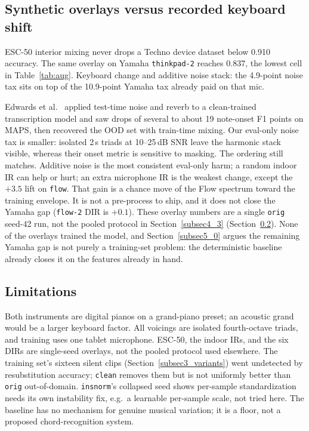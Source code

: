 \documentclass[pdflatex,sn-mathphys-num,iicol]{sn-jnl}
\theoremstyle{thmstyleone}
\theoremstyle{thmstyletwo}
\theoremstyle{thmstylethree}
\begin{document}
\subsection{Synthetic overlays versus recorded keyboard shift}\label{subsec5_2}

ESC-50 interior mixing never drops a Techno device dataset below 0.910 accuracy. The same overlay on Yamaha \texttt{thinkpad-2} reaches 0.837, the lowest cell in Table~\ref{tab:aug}. Keyboard change and additive noise stack: the 4.9-point noise tax sits on top of the 10.9-point Yamaha tax already paid on that mic.

Edwards et al.\ \cite{Edwards2024} applied test-time noise and reverb to a clean-trained transcription model and saw drops of several to about 19 note-onset F1 points on MAPS, then recovered the OOD set with train-time mixing. Our eval-only noise tax is smaller: isolated 2\,s triads at 10--25\,dB SNR leave the harmonic stack visible, whereas their onset metric is sensitive to masking. The ordering still matches. Additive noise is the most consistent eval-only harm; a random indoor IR can help or hurt; an extra microphone IR is the weakest change, except the $+3.5$ lift on \texttt{flow}. That gain is a chance move of the Flow spectrum toward the training envelope. It is not a pre-process to ship, and it does not close the Yamaha gap (\texttt{flow-2} DIR is $+0.1$). These overlay numbers are a single \texttt{orig} seed-42 run, not the pooled protocol in Section~\ref{subsec4_3} (Section~\ref{subsec5_3}). None of the overlays trained the model, and Section~\ref{subsec5_0} argues the remaining Yamaha gap is not purely a training-set problem: the deterministic baseline already closes it on the features already in hand.

\subsection{Limitations}\label{subsec5_3}

Both instruments are digital pianos on a grand-piano preset; an acoustic grand would be a larger keyboard factor. All voicings are isolated fourth-octave triads, and training uses one tablet microphone. ESC-50, the indoor IRs, and the six DIRs are single-seed overlays, not the pooled protocol used elsewhere. The training set's sixteen silent clips (Section~\ref{subsec3_variants}) went undetected by resubstitution accuracy; \texttt{clean} removes them but is not uniformly better than \texttt{orig} out-of-domain. \texttt{insnorm}'s collapsed seed shows per-sample standardization needs its own instability fix, e.g.\ a learnable per-sample scale, not tried here. The baseline has no mechanism for genuine musical variation; it is a floor, not a proposed chord-recognition system.
\end{document}
